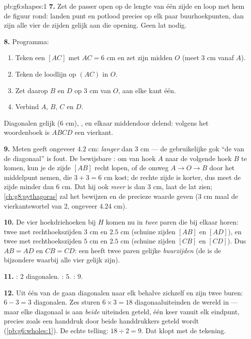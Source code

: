 \begin{solution}{pb:g6:shapes:1}
\textbf{7.} Zet de passer open op de lengte van één zijde en loop met hem de
figuur rond: landen punt en potlood precies op elk paar buurhoekpunten, dan zijn
alle vier de zijden gelijk aan die opening. Geen lat nodig.

\textbf{8.} Programma:
\begin{enumerate}
  \item Teken een  $[AC]$ met $AC = 6$ cm en zet zijn midden $O$ (meet
        $3$ cm vanaf $A$).
  \item Teken de loodlijn op $(AC)$ in $O$.
  \item Zet daarop $B$ en $D$ op $3$ cm van $O$, aan elke kant één.
  \item Verbind $A$, $B$, $C$ en $D$.
\end{enumerate}
Diagonalen gelijk ($6$ cm), , en elkaar middendoor delend: volgens het
woordenboek is $ABCD$ een vierkant.

\textbf{9.} Meten geeft ongeveer $4.2$ cm: \emph{langer} dan $3$ cm --- de
gebruikelijke gok ``de  van de diagonaal'' is fout. De bewijsbare : om
van hoek $A$ naar de volgende hoek $B$ te komen, kun je de zijde $[AB]$ recht
lopen, of de omweg $A \to O \to B$ door het middelpunt nemen, die $3 + 3 = 6$ cm
kost; de rechte zijde is korter, dus meet de zijde minder dan $6$ cm. Dat hij
ook \emph{meer} is dan $3$ cm, laat de lat zien;
\cref{ch:g8:pythagoras} zal het bewijzen en de precieze waarde geven ($3$ cm
maal de vierkantswortel van $2$, ongeveer $4.24$ cm).

\textbf{10.} De vier hoekdriehoeken bij $H$ komen nu in \emph{twee} paren die
bij elkaar horen: twee met rechthoekszijden $3$ cm en $2.5$ cm (schuine zijden
$[AB]$ en $[AD]$), en twee met rechthoekszijden $5$ cm en $2.5$ cm (schuine
zijden $[CB]$ en $[CD]$). Dus $AB = AD$ en $CB = CD$: een  heeft twee
paren gelijke \emph{buurzijden} (de  is de bijzondere  waarbij alle
vier gelijk zijn).

\textbf{11.} : $2$ diagonalen. : $5$. : $9$.

\textbf{12.} Uit één  van de  gaan diagonalen naar elk 
behalve zichzelf en zijn twee buren: $6 - 3 = 3$ diagonalen. Zes 
sturen $6 \times 3 = 18$ diagonaaluiteinden de wereld in --- maar elke diagonaal
is aan \emph{beide} uiteinden geteld, één keer vanuit elk eindpunt, precies zoals
een handdruk door beide handdrukkers geteld wordt
(\cref{pb:g6:wholes:1}). De echte telling: $18 \div 2 = 9$. Dat klopt met de
tekening.


\end{solution}
